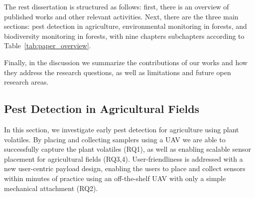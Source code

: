 The rest dissertation is structured as follows: first, there is an overview of published works and other relevant activities. Next, there are the three main sections: pest detection in agriculture, environmental monitoring in forests, and biodiversity monitoring in forests, with nine chapters subchapters according to Table~\ref{tab:paper_overview}.

Finally, in the discussion we summarize the contributions of our works and how they address the research questions, as well as limitations and future open research areas. %


\subsection{Pest Detection in Agricultural Fields}
In this section, we investigate early pest detection for agriculture using plant volatiles. By placing and collecting samplers using a UAV we are able to successfully capture the plant volatiles (RQ1), as well as enabling scalable sensor placement for agricultural fields (RQ3,4). User-friendliness is addressed with a new user-centric payload design, enabling the users to place and collect sensors within minutes of practice using an off-the-shelf UAV with only a simple mechanical attachment (RQ2).


